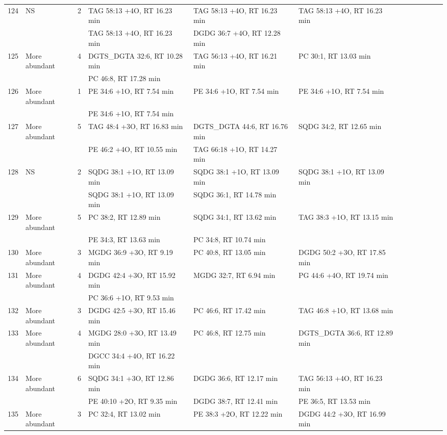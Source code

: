 \begin{landscape}
\begin{footnotesize}
\begin{singlespace}
\begin{flushleft}
\begin{longtable}{ Lp{.03\linewidth} Lp{.12\linewidth} Lp{.03\linewidth} Lp{.24\linewidth} Lp{.24\linewidth} Lp{.24\linewidth} }
124 & NS & 2 & TAG 58:13 +4O, RT 16.23 min & TAG 58:13 +4O, RT 16.23 min & TAG 58:13 +4O, RT 16.23 min \\
 &  &  & TAG 58:13 +4O, RT 16.23 min & DGDG 36:7 +4O, RT 12.28 min &  \\
125 & More abundant & 4 & DGTS\_DGTA 32:6, RT 10.28 min & TAG 56:13 +4O, RT 16.21 min & PC 30:1, RT 13.03 min \\
 &  &  & PC 46:8, RT 17.28 min &  &  \\
126 & More abundant & 1 & PE 34:6 +1O, RT 7.54 min & PE 34:6 +1O, RT 7.54 min & PE 34:6 +1O, RT 7.54 min \\
 &  &  & PE 34:6 +1O, RT 7.54 min &  &  \\
127 & More abundant & 5 & TAG 48:4 +3O, RT 16.83 min & DGTS\_DGTA 44:6, RT 16.76 min & SQDG 34:2, RT 12.65 min \\
 &  &  & PE 46:2 +4O, RT 10.55 min & TAG 66:18 +1O, RT 14.27 min &  \\
128 & NS & 2 & SQDG 38:1 +1O, RT 13.09 min & SQDG 38:1 +1O, RT 13.09 min & SQDG 38:1 +1O, RT 13.09 min \\
 &  &  & SQDG 38:1 +1O, RT 13.09 min & SQDG 36:1, RT 14.78 min &  \\
129 & More abundant & 5 & PC 38:2, RT 12.89 min & SQDG 34:1, RT 13.62 min & TAG 38:3 +1O, RT 13.15 min \\
 &  &  & PE 34:3, RT 13.63 min & PC 34:8, RT 10.74 min &  \\
130 & More abundant & 3 & MGDG 36:9 +3O, RT 9.19 min & PC 40:8, RT 13.05 min & DGDG 50:2 +3O, RT 17.85 min \\
131 & More abundant & 4 & DGDG 42:4 +3O, RT 15.92 min & MGDG 32:7, RT 6.94 min & PG 44:6 +4O, RT 19.74 min \\
 &  &  & PC 36:6 +1O, RT 9.53 min &  &  \\
132 & More abundant & 3 & DGDG 42:5 +3O, RT 15.46 min & PC 46:6, RT 17.42 min & TAG 46:8 +1O, RT 13.68 min \\
133 & More abundant & 4 & MGDG 28:0 +3O, RT 13.49 min & PC 46:8, RT 12.75 min & DGTS\_DGTA 36:6, RT 12.89 min \\
 &  &  & DGCC 34:4 +4O, RT 16.22 min &  &  \\
134 & More abundant & 6 & SQDG 34:1 +3O, RT 12.86 min & DGDG 36:6, RT 12.17 min & TAG 56:13 +4O, RT 16.23 min \\
 &  &  & PE 40:10 +2O, RT 9.35 min & DGDG 38:7, RT 12.41 min & PE 36:5, RT 13.53 min \\
135 & More abundant & 3 & PC 32:4, RT 13.02 min & PE 38:3 +2O, RT 12.22 min & DGDG 44:2 +3O, RT 16.99 min \\

\end{longtable}
\end{flushleft}
\end{singlespace}
\end{footnotesize}
\end{landscape}
